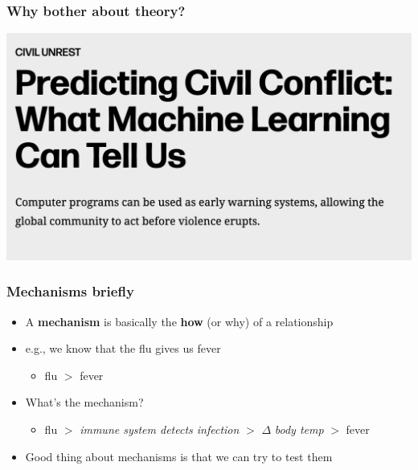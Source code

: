 \documentclass[aspectratio=43]{beamer}
\begin{document}
\begin{frame}
\frametitle{Why bother about theory?}
\centering

\includegraphics[width = \textwidth]{../img/predicting_conflict}

\end{frame}

\begin{frame}
\frametitle{Mechanisms briefly}
\centering

\begin{itemize}
  \item A \textbf{mechanism} is basically the \textbf{how} (or why) of a relationship
  \item e.g., we know that the flu gives us fever
  \begin{itemize}
    \item flu $>$ fever
  \end{itemize}
  \item<2-> What's the mechanism?
  \begin{itemize}
    \item flu $>$ \textit{immune system detects infection} $>$ $\Delta$ \textit{body temp} $>$ fever
  \end{itemize}
  \item<3-> Good thing about mechanisms is that we can try to test them
\end{itemize}

\end{frame}
\end{document}

